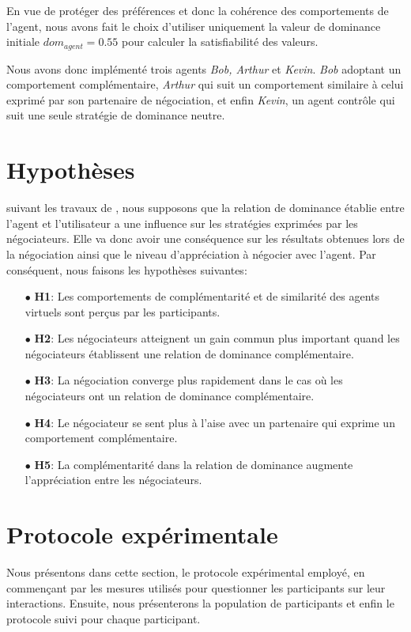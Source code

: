 En vue de protéger des préférences et donc la cohérence des comportements de l'agent, nous avons fait le choix d'utiliser uniquement la valeur de dominance initiale $dom_{agent} = 0.55$ pour calculer la satisfiabilité des valeurs.

Nous avons donc implémenté trois agents \emph{Bob, Arthur} et \emph{Kevin}. \emph{Bob} adoptant un comportement complémentaire, \emph{Arthur} qui suit un comportement similaire à celui exprimé par son partenaire de négociation, et enfin \emph{Kevin}, un agent contrôle qui suit une seule stratégie de dominance neutre. 

\section{Hypothèses}
\label{sec:H}

suivant les travaux de \cite{tiedens2003power,dryer1997opposites,wiltermuth2015benefits}, nous supposons que la relation de dominance établie entre l'agent et l'utilisateur a une influence sur les stratégies exprimées par les négociateurs. Elle va donc avoir une conséquence sur les résultats obtenues lors de la négociation ainsi que le niveau d'appréciation à négocier avec l'agent.
Par conséquent, nous faisons les hypothèses suivantes: 
\begin{itemize}
	\item [$\bullet$] \textbf{H1}: Les comportements de complémentarité et de similarité des agents virtuels sont perçus par les participants.
	\item [$\bullet$] \textbf{H2}: Les négociateurs atteignent un gain commun plus important quand les négociateurs établissent une relation de dominance complémentaire.
	\item [$\bullet$] \textbf{H3}: La négociation converge plus rapidement dans le cas où les négociateurs ont un relation de dominance complémentaire. 
	\item [$\bullet$] \textbf{H4}: Le négociateur se sent plus à l'aise avec un partenaire qui exprime un comportement complémentaire.
	\item [$\bullet$] \textbf{H5}: La complémentarité dans la relation de dominance augmente l'appréciation entre les négociateurs.
\end{itemize}



\section{Protocole expérimentale}
\label{sec:procedure}
Nous présentons dans cette section, le protocole expérimental employé, en commençant par les mesures utilisés pour questionner les participants sur leur interactions. Ensuite, nous présenterons la population de participants et enfin le protocole suivi pour chaque participant. 

